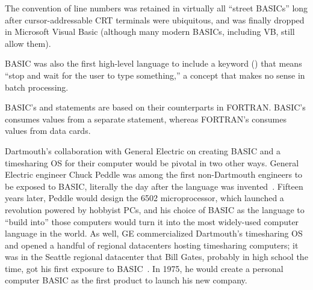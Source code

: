   \begin{tangent}
  The convention of line numbers was retained in virtually all ``street
  BASICs'' long after cursor-addressable CRT terminals were ubiquitous,
  and was finally dropped in Microsoft Visual Basic (although many modern
  BASICs, including VB, still allow them).
  \end{tangent}

BASIC was also the first high-level language to include a keyword
() that means ``stop and wait for
the user to type something,'' a concept that makes no sense in batch
processing. 

  \begin{tangent}
  BASIC's  and  statements are based on their
  counterparts in FORTRAN.  BASIC's  consumes values from a
  separate  statement, whereas FORTRAN's  consumes
  values from data cards.
  \end{tangent}

Dartmouth's  collaboration with General Electric on creating BASIC and a
timesharing OS for their computer would be pivotal in two other ways.
General Electric engineer Chuck Peddle was among the first non-Dartmouth
engineers to be exposed to
BASIC, literally the day after the language was
invented~\cite[p.~5]{commodore}.
Fifteen years later, Peddle would design the 6502 microprocessor, which launched
a revolution powered by hobbyist PCs, and his choice of BASIC as the
language to ``build into'' those computers would turn it into the most
widely-used computer language in the world.
As well, GE commercialized Dartmouth's timesharing OS and opened a
handful of regional datacenters hosting timesharing computers; it was in
the Seattle regional datacenter that Bill Gates, probably in high school
the time, got his first exposure to BASIC~\cite{basic_history_gdm}.  In
1975, he would create a personal computer BASIC as the first product to
launch his new company.
